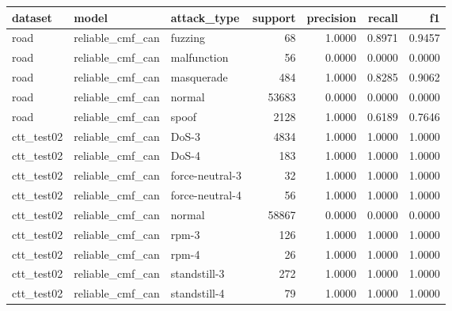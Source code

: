\begin{tabular}{lllrrrr}
\toprule
dataset & model & attack\_type & support & precision & recall & f1 \\
\midrule
road & reliable\_cmf\_can & fuzzing & 68 & 1.0000 & 0.8971 & 0.9457 \\
road & reliable\_cmf\_can & malfunction & 56 & 0.0000 & 0.0000 & 0.0000 \\
road & reliable\_cmf\_can & masquerade & 484 & 1.0000 & 0.8285 & 0.9062 \\
road & reliable\_cmf\_can & normal & 53683 & 0.0000 & 0.0000 & 0.0000 \\
road & reliable\_cmf\_can & spoof & 2128 & 1.0000 & 0.6189 & 0.7646 \\
ctt\_test02 & reliable\_cmf\_can & DoS-3 & 4834 & 1.0000 & 1.0000 & 1.0000 \\
ctt\_test02 & reliable\_cmf\_can & DoS-4 & 183 & 1.0000 & 1.0000 & 1.0000 \\
ctt\_test02 & reliable\_cmf\_can & force-neutral-3 & 32 & 1.0000 & 1.0000 & 1.0000 \\
ctt\_test02 & reliable\_cmf\_can & force-neutral-4 & 56 & 1.0000 & 1.0000 & 1.0000 \\
ctt\_test02 & reliable\_cmf\_can & normal & 58867 & 0.0000 & 0.0000 & 0.0000 \\
ctt\_test02 & reliable\_cmf\_can & rpm-3 & 126 & 1.0000 & 1.0000 & 1.0000 \\
ctt\_test02 & reliable\_cmf\_can & rpm-4 & 26 & 1.0000 & 1.0000 & 1.0000 \\
ctt\_test02 & reliable\_cmf\_can & standstill-3 & 272 & 1.0000 & 1.0000 & 1.0000 \\
ctt\_test02 & reliable\_cmf\_can & standstill-4 & 79 & 1.0000 & 1.0000 & 1.0000 \\
\bottomrule
\end{tabular}
